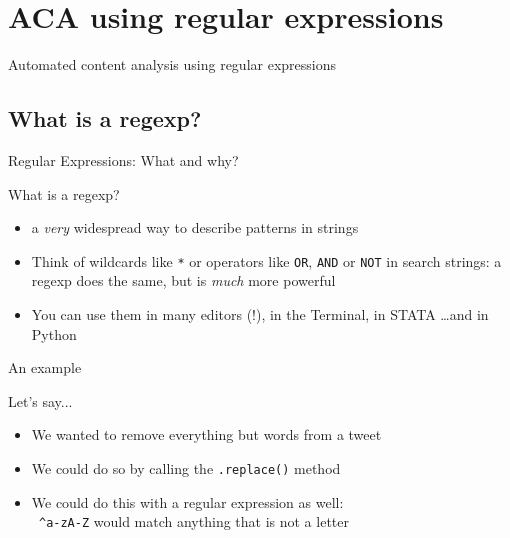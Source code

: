 \documentclass[handout]{beamer}
\begin{document}
\section[Regular expressions]{ACA using regular expressions}

\begin{frame}
	Automated content analysis using regular expressions
\end{frame}



\subsection{What is a regexp?}
\begin{frame}{Regular Expressions: What and why?}
\begin{block}{What is a regexp?}
\begin{itemize}
\item<1-> a \emph{very} widespread way to describe patterns in strings
\item<2-> Think of wildcards like {\tt{*}} or operators like {\tt{OR}}, {\tt{AND}} or {\tt{NOT}} in search strings: a regexp does the same, but is \emph{much} more powerful
\item<3-> You can use them in many editors (!), in the Terminal, in STATA \ldots and in Python
\end{itemize}
\end{block}
\end{frame}

\begin{frame}{An example}
\begin{block}{Let's say...}
\begin{itemize}
\item We wanted to remove everything but words from a tweet
\item We could do so by calling the \texttt{.replace()} method
\item We could do this with a regular expression as well: \\
{\tt{ \lbrack \^{}a-zA-Z\rbrack}} would match anything that is not a letter
\end{itemize}
\end{block}
\end{frame}
\end{document}

